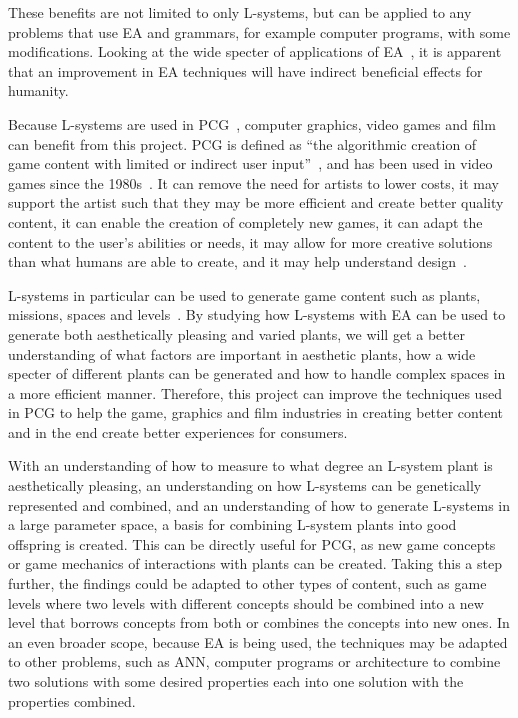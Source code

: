 These benefits are not limited to only \glspl{L-system}, but can be applied to any problems that use \gls{EA} and grammars, for example computer programs, with some modifications.
Looking at the wide specter of applications of \gls{EA}~\cite{2006AshlockEA}, it is apparent that an improvement in \gls{EA} techniques will have indirect beneficial effects for humanity.

Because \glspl{L-system} are used in \gls{PCG}~\cite{PCG_5}, computer graphics, video games and film can benefit from this project.
\Gls{PCG} is defined as ``the algorithmic creation of game content with limited or indirect user input''~\cite{2011Togelius}, and has been used in video games since the 1980s~\cite{PCG_1}.
It can remove the need for artists to lower costs, it may support the artist such that they may be more efficient and create better quality content, it can enable the creation of completely new games, it can adapt the content to the user's abilities or needs, it may allow for more creative solutions than what humans are able to create, and it may help understand design~\cite{PCG_1}.

\Glspl{L-system} in particular can be used to generate game content such as plants, missions, spaces and levels~\cite{PCG_5}.
By studying how \glspl{L-system} with \gls{EA} can be used to generate both aesthetically pleasing and varied plants, we will get a better understanding of what factors are important in aesthetic plants, how a wide specter of different plants can be generated and how to handle complex spaces in a more efficient manner.
Therefore, this project can improve the techniques used in \gls{PCG} to help the game, graphics and film industries in creating better content and in the end create better experiences for consumers.

With an understanding of how to measure to what degree an L-system plant is aesthetically pleasing, an understanding on how L-systems can be genetically represented and combined, and an understanding of how to generate L-systems in a large parameter space, a basis for combining L-system plants into good offspring is created.
This can be directly useful for \gls{PCG}, as new game concepts or game mechanics of interactions with plants can be created.
Taking this a step further, the findings could be adapted to other types of content, such as game levels where two levels with different concepts should be combined into a new level that borrows concepts from both or combines the concepts into new ones.
In an even broader scope, because \gls{EA} is being used, the techniques may be adapted to other problems, such as \gls{ANN}, computer programs or architecture to combine two solutions with some desired properties each into one solution with the properties combined.

